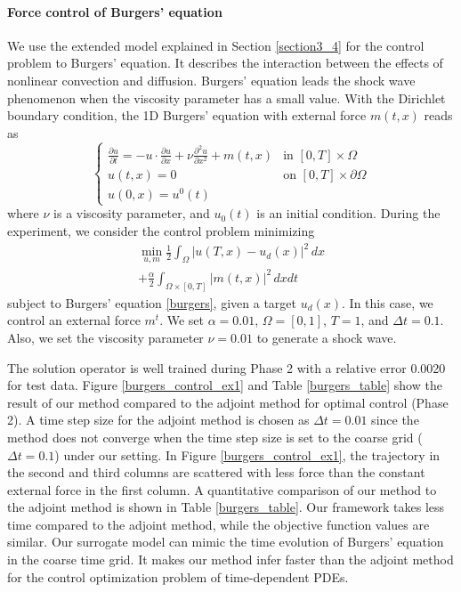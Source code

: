 \documentclass[letterpaper]{article}
\begin{document}
\paragraph{Force control of Burgers' equation}
We use the extended model explained in Section \ref{section3_4} for the control problem to Burgers' equation. It describes the interaction between the effects of nonlinear convection and diffusion. Burgers' equation leads the shock wave phenomenon when the viscosity parameter has a small value. With the Dirichlet boundary condition, the 1D Burgers' equation with external force $m(t, x)$ reads as
\begin{equation}\label{burgers}
  \begin{cases}
    \frac{\partial u}{\partial t} = -u \cdot \frac{\partial u}{\partial x} + \nu \frac{\partial^2 u}{\partial x^2} + m(t, x) &\text{in }[0, T]\times\Omega\\
    u(t, x) = 0 \quad &\text{on } [0, T]\times\partial\Omega\\
    u(0, x) = u^0(t)
  \end{cases}
\end{equation}
where $\nu$ is a viscosity parameter, and $u_0(t)$ is an initial condition. During the experiment, we consider the control problem minimizing
\begin{multline}
  \min_{u, m} \frac{1}{2}\int_{\Omega} |u(T, x) - u_d(x)|^2 \, dx \\
  + \frac{\alpha}{2} \int_{\Omega\times[0, T]} |m(t, x)|^2 \, dx dt
\end{multline}
subject to Burgers' equation \eqref{burgers}, given a target $u_d(x)$. In this case, we control an external force $m^t$. We set $\alpha=0.01$, $\Omega=[0,1]$, $T=1$, and $\Delta t=0.1$. Also, we set the viscosity parameter $\nu=0.01$ to generate a shock wave.

The solution operator is well trained during Phase 2 with a relative error 0.0020 for test data. Figure \ref{burgers_control_ex1} and Table \ref{burgers_table} show the result of our method compared to the adjoint method for optimal control (Phase 2). A time step size for the adjoint method is chosen as $\Delta t=0.01$ since the method does not converge when the time step size is set to the coarse grid ($\Delta t=0.1$) under our setting. In Figure \ref{burgers_control_ex1}, the trajectory in the second and third columns are scattered with less force than the constant external force in the first column. A quantitative comparison of our method to the adjoint method is shown in Table \ref{burgers_table}. Our framework takes less time compared to the adjoint method, while the objective function values are similar. Our surrogate model can mimic the time evolution of Burgers' equation in the coarse time grid. It makes our method infer faster than the adjoint method for the control optimization problem of time-dependent PDEs.
\end{document}
